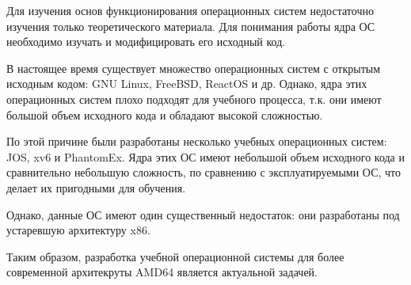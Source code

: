 \Introduction


Для изучения основ функционирования операционных систем недостаточно
изучения только теоретического материала. Для понимания работы ядра
ОС необходимо изучать и модифицировать его исходный код.

В настоящее время существует множество операционных систем с открытым
исходным кодом: GNU Linux, FreeBSD, ReactOS и др. Однако, ядра этих
операционных систем плохо подходят для учебного процесса, т.к. они
имеют большой объем исходного кода и обладают высокой сложностью.

По этой причине были разработаны несколько учебных операционных
систем: JOS, xv6 и PhantomEx. Ядра этих ОС имеют небольшой объем
исходного кода и сравнительно небольшую сложность, по сравнению с
эксплуатируемыми ОС, что делает их пригодными для обучения.

Однако, данные ОС имеют один существенный недостаток: они разработаны
под устаревшую архитектуру x86.

Таким образом, разработка учебной операционной системы для более современной
архитекруты AMD64 является актуальной задачей.
